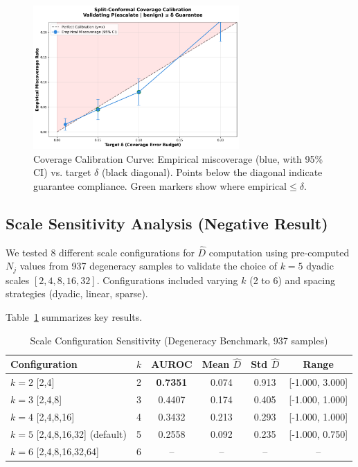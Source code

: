 \documentclass[11pt]{article}
\begin{document}
\begin{figure}[h]
\centering
\includegraphics[width=0.7\textwidth]{figures/coverage_calibration.png}
\caption{Coverage Calibration Curve: Empirical miscoverage (blue, with 95\% CI) vs. target $\delta$ (black diagonal). Points below the diagonal indicate guarantee compliance. Green markers show where $\text{empirical} \le \delta$.}
\label{fig:coverage-calibration}
\end{figure}

\subsection{Scale Sensitivity Analysis (Negative Result)}
\label{sec:validation-scales}

We tested 8 different scale configurations for $\hat{D}$ computation using pre-computed $N_j$ values from 937 degeneracy samples to validate the choice of $k=5$ dyadic scales $[2,4,8,16,32]$. Configurations included varying $k$ (2 to 6) and spacing strategies (dyadic, linear, sparse).

Table~\ref{tab:scale-results} summarizes key results.

\begin{table}[h]
\centering
\caption{Scale Configuration Sensitivity (Degeneracy Benchmark, 937 samples)}
\label{tab:scale-results}
\begin{tabular}{lccccc}
\toprule
\textbf{Configuration} & \textbf{$k$} & \textbf{AUROC} & \textbf{Mean $\hat{D}$} & \textbf{Std $\hat{D}$} & \textbf{Range} \\
\midrule
$k=2$ [2,4] & 2 & \textbf{0.7351} & 0.074 & 0.913 & [-1.000, 3.000] \\
$k=3$ [2,4,8] & 3 & 0.4407 & 0.174 & 0.405 & [-1.000, 1.000] \\
$k=4$ [2,4,8,16] & 4 & 0.3432 & 0.213 & 0.293 & [-1.000, 1.000] \\
$k=5$ [2,4,8,16,32] (default) & 5 & 0.2558 & 0.092 & 0.235 & [-1.000, 0.750] \\
$k=6$ [2,4,8,16,32,64] & 6 & -- & -- & -- & -- \\
\bottomrule
\end{tabular}
\end{table}
\end{document}
